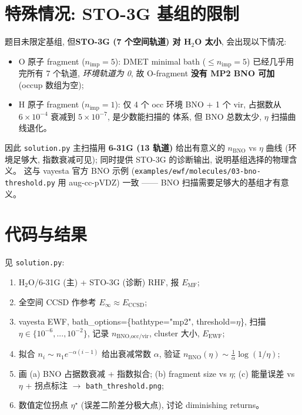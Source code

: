 \documentclass[11pt]{article}
\begin{document}
\section{特殊情况: STO-3G 基组的限制}
题目未限定基组, 但\textbf{STO-3G (7 个空间轨道) 对 H$_2$O 太小}, 会出现以下情况:
\begin{itemize}
  \item O 原子 fragment ($n_{\text{imp}}=5$): DMET minimal bath
        ($\le n_{\text{imp}}=5$) 已经几乎用完所有 7 个轨道, \emph{环境轨道为 0},
        故 O-fragment \textbf{没有 MP2 BNO 可加} (occup 数组为空);
  \item H 原子 fragment ($n_{\text{imp}}=1$): 仅 4 个 occ 环境 BNO + 1 个 vir,
        占据数从 $6{\times}10^{-4}$ 衰减到 $5{\times}10^{-7}$, 是少数能扫描的
        体系, 但 BNO 总数太少, $\eta$ 扫描曲线退化。
\end{itemize}
因此 \texttt{solution.py} 主扫描用 \textbf{6-31G (13 轨道)} 给出有意义的
$n_{\text{BNO}}$ vs $\eta$ 曲线 (环境足够大, 指数衰减可见);
同时提供 STO-3G 的诊断输出, 说明基组选择的物理含义。
这与 vayesta 官方 BNO 示例 (\texttt{examples/ewf/molecules/03-bno-threshold.py}
用 aug-cc-pVDZ) 一致 —— BNO 扫描需要足够大的基组才有意义。

\section*{代码与结果}
见 \texttt{solution.py}:
\begin{enumerate}
  \item H$_2$O/6-31G (主) + STO-3G (诊断) RHF, 报 $E_{\text{MF}}$;
  \item 全空间 CCSD 作参考 $E_{\infty}\approx E_{\text{CCSD}}$;
  \item vayesta EWF, bath\_options=\{bathtype="mp2", threshold=$\eta$\},
        扫描 $\eta\in\{10^{-6},...,10^{-2}\}$, 记录
        $n_{\text{BNO,occ/vir}}$, cluster 大小, $E_{\text{EWF}}$;
  \item 拟合 $n_i\sim n_1 e^{-\alpha(i-1)}$ 给出衰减常数 $\alpha$, 验证
        $n_{\text{BNO}}(\eta)\sim\tfrac{1}{\alpha}\log(1/\eta)$;
  \item 画 (a) BNO 占据数衰减 + 指数拟合;
        (b) fragment size vs $\eta$;
        (c) 能量误差 vs $\eta$ + 拐点标注
        $\to$ \texttt{bath\_threshold.png};
  \item 数值定位拐点 $\eta^\star$ (误差二阶差分极大点), 讨论 diminishing returns。
\end{enumerate}
\end{document}
